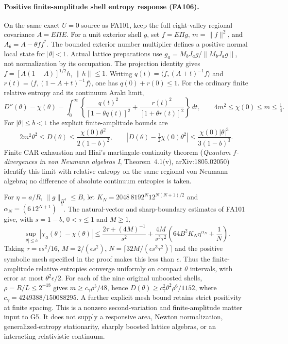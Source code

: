 \paragraph{Positive finite-amplitude shell entropy response (FA106).}
On the same exact $U=0$ source as FA101, keep the full eight-valley
regional covariance $A=E\Pi E$.  For a unit exterior shell $g$, set
$f=E\Pi g$, $m=\|f\|^2$, and $A_\theta=A-\theta ff^*$.
The bounded exterior number multiplier defines a positive normal local
state for $|\theta|<1$.  Actual lattice preparations use
$g_a=M_bJ_ag/\|M_bJ_ag\|$, not normalization by its occupation.
The projection identity gives $f=[A(1-A)]^{1/2}h$, $\|h\|\leq1$.
Writing $q(t)=\langle f,(A+t)^{-1}f\rangle$ and
$r(t)=\langle f,(1-A+t)^{-1}f\rangle$, one has $q(0)+r(0)\leq1$.
For the ordinary finite relative entropy and its continuum Araki limit,
\[
 D''(\theta)=\chi(\theta)=\int_0^\infty
 \left\{\frac{q(t)^2}{[1-\theta q(t)]^2}
       +\frac{r(t)^2}{[1+\theta r(t)]^2}\right\}\,dt,
 \qquad 4m^2\leq\chi(0)\leq m\leq\tfrac14.
\]
For $|\theta|\leq b<1$ the explicit finite-amplitude bounds are
\[
 2m^2\theta^2\leq D(\theta)
 \leq\frac{\chi(0)\theta^2}{2(1-b)^2},\qquad
 \left|D(\theta)-\tfrac12\chi(0)\theta^2\right|
 \leq\frac{\chi(0)|\theta|^3}{3(1-b)^3}.
\]
Finite CAR exhaustion and Hiai's martingale-continuity theorem
(\emph{Quantum $f$-divergences in von Neumann algebras I},
Theorem~4.1(v), arXiv:1805.02050) identify this limit with relative
entropy on the same regional von Neumann algebra; no difference of
absolute continuum entropies is taken.

For $\eta=a/R$, $\|g\|_{H^1}\leq B$, let
$K_N=2048\,8192^N12^{N(N+1)/2}$ and
$\alpha_N=(6\,12^{N+1})^{-1}$.  The natural-vector and sharp-boundary
estimates of FA101 give, with $s=1-b$, $0<\tau\leq1$ and $M\geq1$,
\[
 \sup_{|\theta|\leq b}|\chi_a(\theta)-\chi(\theta)|
 \leq\frac{2\tau+(4M)^{-1}}{s^2}
 +\frac{4M}{s^3\tau^2}
       \left(64B^2K_N\eta^{\alpha_N}+\frac1N\right).
\]
Taking $\tau=\epsilon s^2/16$, $M=2/(\epsilon s^2)$,
$N=\lceil32M/(\epsilon s^3\tau^2)\rceil$ and the positive symbolic
mesh specified in the proof makes this less than $\epsilon$.
Thus the finite-amplitude relative entropies converge uniformly on
compact $\theta$ intervals, with error at most $\theta^2\epsilon/2$.
For each of the nine original unboosted shells, $\rho=R/L\leq2^{-18}$
gives $m\geq c_\gamma\rho^3/48$, hence
$D(\theta)\geq c_\gamma^2\theta^2\rho^6/1152$, where
$c_\gamma=4249388/150088295$.  A further explicit mesh bound retains
strict positivity at finite spacing.
This is a nonzero second-variation and finite-amplitude matter input to
G5.  It does not supply a responsive area, Newton normalization,
generalized-entropy stationarity, sharply boosted lattice algebras,
or an interacting relativistic continuum.
